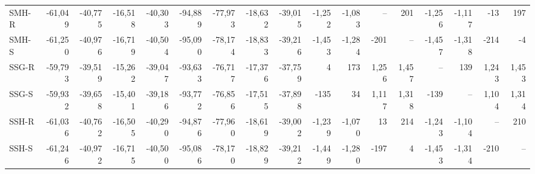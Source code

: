 \begin{table}
\begin{tabular}[t]{lrrrrrrrrrrrrrrrr}
SMH-R & -61,049 & -40,775 & -16,518 & -40,303 & -94,889 & -77,973 & -18,632 & -39,015 & -1,252 & -1,083 & -- & 201 & -1,256 & -1,117 & -13 & 197\\
SMH-S & -61,250 & -40,976 & -16,719 & -40,504 & -95,090 & -78,174 & -18,833 & -39,216 & -1,453 & -1,284 & -201 & -- & -1,457 & -1,318 & -214 & -4\\
\addlinespace
SSG-R & -59,793 & -39,519 & -15,262 & -39,047 & -93,633 & -76,717 & -17,376 & -37,759 & 4 & 173 & 1,256 & 1,457 & -- & 139 & 1,243 & 1,453\\
SSG-S & -59,932 & -39,658 & -15,401 & -39,186 & -93,772 & -76,856 & -17,515 & -37,898 & -135 & 34 & 1,117 & 1,318 & -139 & -- & 1,104 & 1,314\\
SSH-R & -61,036 & -40,762 & -16,505 & -40,290 & -94,876 & -77,960 & -18,619 & -39,002 & -1,239 & -1,070 & 13 & 214 & -1,243 & -1,104 & -- & 210\\
SSH-S & -61,246 & -40,972 & -16,715 & -40,500 & -95,086 & -78,170 & -18,829 & -39,212 & -1,449 & -1,280 & -197 & 4 & -1,453 & -1,314 & -210 & --\\
\bottomrule
\end{tabular}
\end{table}

